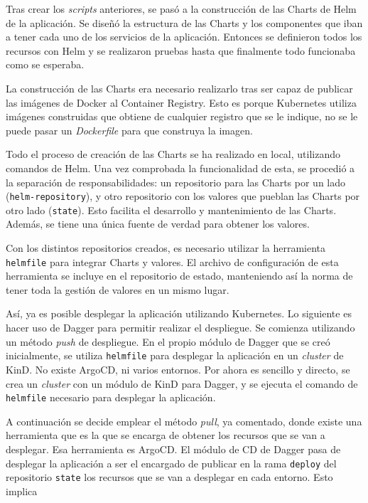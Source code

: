 Tras crear los \textit{scripts} anteriores, se pasó a la construcción de las Charts de Helm de la aplicación. Se diseñó la estructura de las Charts y los componentes que iban a tener cada uno de los servicios de la aplicación. Entonces se definieron todos los recursos con Helm y se realizaron pruebas hasta que finalmente todo funcionaba como se esperaba.

La construcción de las Charts era necesario realizarlo tras ser capaz de publicar las imágenes de Docker al Container Registry. Esto es porque Kubernetes utiliza imágenes construidas que obtiene de cualquier registro que se le indique, no se le puede pasar un \textit{Dockerfile} para que construya la imagen.

Todo el proceso de creación de las Charts se ha realizado en local, utilizando comandos de Helm. Una vez comprobada la funcionalidad de esta, se procedió a la separación de responsabilidades: un repositorio para las Charts por un lado (\texttt{helm-repository}), y otro repositorio con los valores que pueblan las Charts por otro lado (\texttt{state}). Esto facilita el desarrollo y mantenimiento de las Charts. Además, se tiene una única fuente de verdad para obtener los valores.

Con los distintos repositorios creados, es necesario utilizar la herramienta \texttt{helmfile} para integrar Charts y valores. El archivo de configuración de esta herramienta se incluye en el repositorio de estado, manteniendo así la norma de tener toda la gestión de valores en un mismo lugar.

Así, ya es posible desplegar la aplicación utilizando Kubernetes. Lo siguiente es hacer uso de Dagger para permitir realizar el despliegue. Se comienza utilizando un método \textit{push} de despliegue. En el propio módulo de Dagger que se creó inicialmente, se utiliza \texttt{helmfile} para desplegar la aplicación en un \textit{cluster} de KinD. No existe ArgoCD, ni varios entornos. Por ahora es sencillo y directo, se crea un \textit{cluster} con un módulo de KinD para Dagger, y se ejecuta el comando de \texttt{helmfile} necesario para desplegar la aplicación.

A continuación se decide emplear el método \textit{pull}, ya comentado, donde existe una herramienta que es la que se encarga de obtener los recursos que se van a desplegar. Esa herramienta es ArgoCD. El módulo de CD de Dagger pasa de desplegar la aplicación a ser el encargado de publicar en la rama \texttt{deploy} del repositorio \texttt{state} los recursos que se van a desplegar en cada entorno. Esto implica

